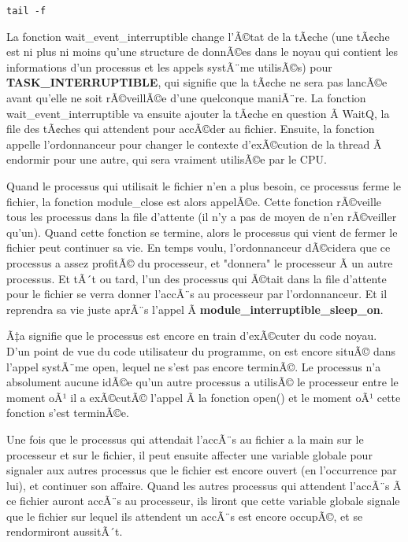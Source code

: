 \documentclass[11pt]{article}
\begin{document}
\begin{verbatim}
tail -f
\end{verbatim}

La fonction wait\_event\_interruptible change l'Ã©tat de la tÃ¢che (une tÃ¢che est ni plus ni moins qu'une structure de donnÃ©es dans le noyau qui contient les informations d'un processus et les appels systÃ¨me utilisÃ©s) pour \textbf{TASK\_INTERRUPTIBLE}, qui signifie que la tÃ¢che ne sera pas lancÃ©e avant qu'elle ne soit rÃ©veillÃ©e d'une quelconque maniÃ¨re. La fonction wait\_event\_interruptible va ensuite ajouter la tÃ¢che en question Ã  WaitQ, la file des tÃ¢ches qui attendent pour accÃ©der au fichier. Ensuite, la fonction appelle l'ordonnanceur pour changer le contexte d'exÃ©cution de la thread Ã  endormir pour une autre, qui sera vraiment utilisÃ©e par le CPU.

Quand le processus qui utilisait le fichier n'en a plus besoin, ce processus ferme le fichier, la fonction module\_close est alors appelÃ©e. Cette fonction rÃ©veille tous les processus dans la file d'attente (il n'y a pas de moyen de n'en rÃ©veiller qu'un). Quand cette fonction se termine, alors le processus qui vient de fermer le fichier peut continuer sa vie. En temps voulu, l'ordonnanceur dÃ©cidera que ce processus a assez profitÃ© du processeur, et "donnera" le processeur Ã  un autre processus. Et tÃ´t ou tard, l'un des processus qui Ã©tait dans la file d'attente pour le fichier se verra donner l'accÃ¨s au processeur par l'ordonnanceur. Et il reprendra sa vie juste aprÃ¨s l'appel Ã  \textbf{module\_interruptible\_sleep\_on}.

Ã‡a signifie que le processus est encore en train d'exÃ©cuter du code noyau. D'un point de vue du code utilisateur du programme, on est encore situÃ© dans l'appel systÃ¨me open, lequel ne s'est pas encore terminÃ©. Le processus n'a absolument aucune idÃ©e qu'un autre processus a utilisÃ© le processeur entre le moment oÃ¹ il a exÃ©cutÃ© l'appel Ã  la fonction open() et le moment oÃ¹ cette fonction s'est terminÃ©e.

Une fois que le processus qui attendait l'accÃ¨s au fichier a la main sur le processeur et sur le fichier, il peut ensuite affecter une variable globale pour signaler aux autres processus que le fichier est encore ouvert (en l'occurrence par lui), et continuer son affaire. Quand les autres processus qui attendent l'accÃ¨s Ã  ce fichier auront accÃ¨s au processeur, ils liront que cette variable globale signale que le fichier sur lequel ils attendent un accÃ¨s est encore occupÃ©, et se rendormiront aussitÃ´t.
\end{document}

